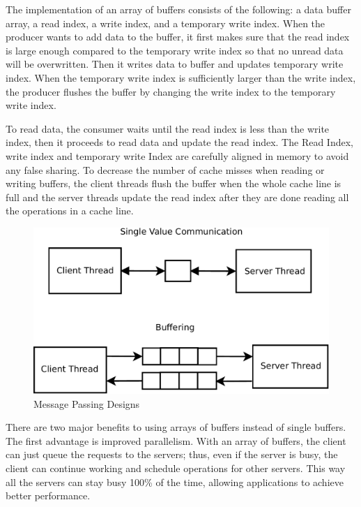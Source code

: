 The implementation of an array of buffers consists of the following: a data
buffer array, a read index, a write index, and a temporary write index. When the
producer wants to add data to the buffer, it first makes sure that the read
index is large enough compared to the temporary write index so that no unread
data will be overwritten. Then it writes data to buffer and updates temporary
write index. When the temporary write index is sufficiently larger than the
write index, the producer flushes the buffer by changing the write index to the
temporary write index.

To read data, the consumer waits until the read index is less than the write
index, then it proceeds to read data and update the read index. The Read Index,
write index and temporary write Index are carefully aligned in memory to avoid
any false sharing.  To decrease the number of cache misses when reading or
writing buffers, the client threads flush the buffer when the whole cache line
is full and the server threads update the read index after they are done reading
all the operations in a cache line.

\begin{figure}[t]
  \centering
  \includegraphics[width=\linewidth]{figs/mpdesign.pdf}
  \caption{Message Passing Designs}
  \label{fig:mpdesign}
\end{figure}

There are two major benefits to using arrays of buffers instead of single
buffers. The first advantage is improved parallelism.  With an array of buffers,
the client can just queue the requests to the servers; thus, even if the server
is busy, the client can continue working and schedule operations for other
servers. This way all the servers can stay busy 100\% of the time, allowing
applications to achieve better performance.


